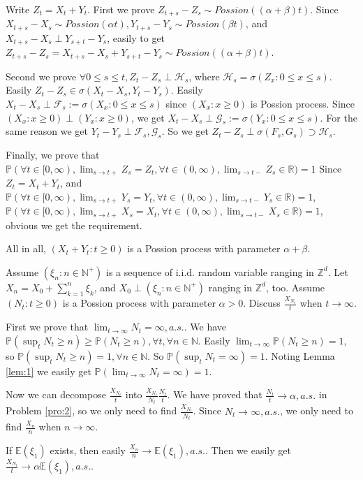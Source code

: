 \documentclass{ctexart}
\begin{document}
\begin{solution}
  Write \(Z_t=X_t + Y_t\). First we prove \(Z_{t+s}-Z_s \sim Possion((\alpha + \beta)t)\).
  Since \(X_{t + s}-X_s \sim Possion(\alpha t),Y_{t+s}-Y_s \sim Possion(\beta t)\), and \(X_{t + s}-X_s \perp Y_{s + t}-Y_s\), easily to get
  \(Z_{t + s}-Z_{s}=X_{t + s}-X_s+Y_{s + t}-Y_s \sim Possion((\alpha + \beta)t)\).

  Second we prove \(\forall 0 \leq s \leq t,Z_t-Z_s \perp \mathcal{H}_s\), where \(\mathcal{H}_s =\sigma(Z_x:0 \leq x \leq s)\).
  Easily \(Z_t-Z_s \in \sigma(X_t-X_s,Y_t-Y_s)\).
  Easily \(X_t-X_s \perp \mathcal{F}_s:=\sigma(X_x:0 \leq x \leq s)\) since \((X_x:x \geq 0)\) is Possion process.
  Since \((X_x:x \geq 0)\perp (Y_x:x \geq 0)\), we get \(X_t-X_s \perp \mathcal{G}_s:=\sigma(Y_x:0 \leq x \leq s)\).
  For the same reason we get \(Y_t-Y_s \perp \mathcal{F}_s,\mathcal{G}_s\).
  So we get \(Z_t-Z_s \perp \sigma(F_s,G_s) \supset \mathcal{H}_s\).

  Finally, we prove that \(\mathbb{P}(\forall t \in [0,\infty),\lim_{s \to t+}Z_s =Z_t,\forall t \in (0,\infty),\lim_{s \to t-}Z_s \in \mathbb{R})=1\)
  Since \(Z_t=X_t + Y_t\), and
  \(\mathbb{P}(\forall t \in [0,\infty),\lim_{s \to t+}Y_s =Y_t,\forall t \in (0,\infty),\lim_{s \to t-}Y_s \in \mathbb{R})=1\),
  \(\mathbb{P}(\forall t \in [0,\infty),\lim_{s \to t+}X_s =X_t,\forall t \in (0,\infty),\lim_{s \to t-}X_s \in \mathbb{R})=1\),
  obvious we get the requirement.

  All in all, \((X_t + Y_t:t \geq 0)\) is a Possion process with parameter \(\alpha + \beta\).
\end{solution}
\begin{problem}\label{pro:5}
  Assume \((\xi_n:n \in \mathbb{N}^+)\) is a sequence of i.i.d. random variable ranging in \(\mathbb{Z}^d\).
  Let \(X_n=X_0 + \sum_{k=1}^{n}\xi_k\), and \(X_0 \perp (\xi_n:n \in \mathbb{N}^+)\) ranging in \(\mathbb{Z}^d\), too.
  Assume \((N_t:t \geq 0)\) is a Possion process with parameter \(\alpha>0\).
  Discuss \(\frac{X_{N_t}}{t}\) when \(t \to \infty\).
\end{problem}
\begin{solution}
  First we prove that \(\lim_{t \to \infty}N_t=\infty,a. s.\).
  We have \(\mathbb{P}(\sup_{t}N_t \geq n)\geq \mathbb{P}(N_t \geq n),\forall t ,\forall n \in \mathbb{N}\).
  Easily \(\lim_{t \to \infty}\mathbb{P}(N_t \geq n)=1\), so \(\mathbb{P}(\sup_{t}N_t \geq n)=1,\forall n \in \mathbb{N}\).
  So \(\mathbb{P}(\sup_{t}N_t=\infty)=1\).
  Noting Lemma \ref{lem:1} we easily get \(\mathbb{P}(\lim_{t \to \infty}N_t = \infty)=1\).

  Now we can decompose \(\frac{X_{N_t}}{t}\) into \(\frac{X_{N_t}}{N_t} \frac{N_t}{t}\).
  We have proved that \(\frac{N_t}{t} \to \alpha,a. s.\) in Problem \ref{pro:2}, so we only need to find \(\frac{X_{N_t}}{N_t}\).
  Since \(N_t \to \infty,a. s.\), we only need to find \(\frac{X_n}{n}\) when \(n \to \infty\).

  If \(\mathbb{E}(\xi_1)\) exists, then easily \(\frac{X_n}{n} \to \mathbb{E}(\xi_1),a. s.\).
  Then we easily get \(\frac{X_{N_t}}{t} \to \alpha \mathbb{E}(\xi_1),a. s.\).
\end{solution}
\end{document}
